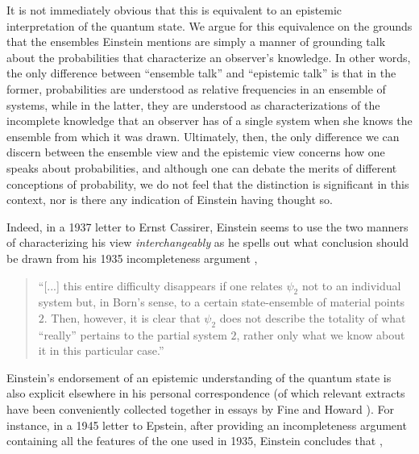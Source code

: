 \documentclass[aps,nofootinbib,12pt]{revtex4}
\begin{document}
It is not immediately obvious that this is equivalent to an
epistemic interpretation of the quantum state. We argue for this
equivalence on the grounds that the ensembles Einstein mentions are
simply a manner of grounding talk about the probabilities that
characterize an observer's knowledge. In other words, the only
difference between ``ensemble talk'' and ``epistemic talk'' is that
in the former, probabilities are understood as relative frequencies
in an ensemble of systems, while in the latter, they are understood
as characterizations of the incomplete knowledge that an observer
has of a single system when she knows the ensemble from which it was
drawn. Ultimately, then, the only difference we can discern between
the ensemble view and the epistemic view concerns how one speaks
about probabilities, and although one can debate the merits of
different conceptions of probability, we do not feel that the
distinction is significant in this context, nor is there any
indication of Einstein having thought so.

Indeed, in a 1937 letter to Ernst Cassirer, Einstein seems to use
the two manners of characterizing his view \emph{interchangeably} as
he spells out what conclusion should be drawn from his 1935
incompleteness argument \cite{EtoCassirer},

\begin{quote}
``[...] this entire difficulty disappears if one relates $\psi_{2}$
not to an individual system but, in Born's sense, to a certain
state-ensemble of material points $2$. Then, however, it is clear
that $\psi_{2}$ does not describe the totality of what ``really''
pertains to the partial system $2$, rather only what we know about
it in this particular case.''
\end{quote}

\strut Einstein's endorsement of an epistemic understanding of the
quantum state is also explicit elsewhere in his personal
correspondence (of which relevant extracts have been conveniently
collected together in essays by Fine and Howard
\cite{Fine:Eincontext,Howard_einst_short,Howard_einst_long}). For
instance, in a 1945 letter to Epstein, after providing an
incompleteness argument containing all the features of the one used
in 1935, Einstein concludes that \cite{EtoEpstein},
\end{document}
